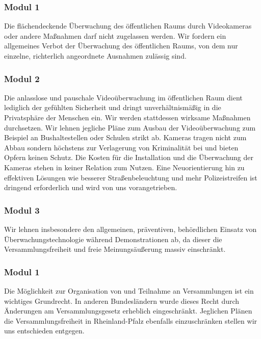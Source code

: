 \newpage
{}
\subsubsection{Modul 1}
\abstimmung
Die flächendeckende Überwachung des öffentlichen Raums durch Videokameras oder andere Maßnahmen darf nicht zugelassen werden. Wir fordern ein allgemeines Verbot der Überwachung des öffentlichen Raums, von dem nur einzelne, richterlich angeordnete Ausnahmen zulässig sind.

\subsubsection{Modul 2}
\abstimmung
Die anlasslose und pauschale Videoüberwachung im öffentlichen Raum dient lediglich der gefühlten Sicherheit und dringt unverhältnismäßig in die Privatsphäre der Menschen ein. Wir werden stattdessen wirksame Maßnahmen durchsetzen. Wir lehnen jegliche Pläne zum Ausbau der Videoüberwachung zum Beispiel an Bushaltestellen oder Schulen strikt ab. Kameras tragen nicht zum Abbau sondern höchstens zur Verlagerung von Kriminalität bei und bieten Opfern keinen Schutz. Die Kosten für die Installation und die Überwachung der Kameras stehen in keiner Relation zum Nutzen. Eine Neuorientierung hin zu effektiven Lösungen wie besserer Straßenbeleuchtung und mehr Polizeistreifen ist dringend erforderlich und wird von uns vorangetrieben.

\subsubsection{Modul 3}
\abstimmung
Wir lehnen insbesondere den allgemeinen, präventiven, behördlichen Einsatz von Überwachungstechnologie während Demonstrationen ab, da dieser die Versammlungsfreiheit und freie Meinungsäußerung massiv einschränkt.
 
\subsubsection{Modul 1}
\abstimmung
Die Möglichkeit zur Organisation von und Teilnahme an Versammlungen ist ein wichtiges Grundrecht. In anderen Bundesländern wurde dieses Recht durch Änderungen am Versammlungsgesetz erheblich eingeschränkt. Jeglichen Plänen die Versammlungsfreiheit in Rheinland-Pfalz ebenfalls einzuschränken stellen wir uns entschieden entgegen.

